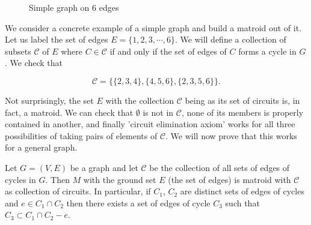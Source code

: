 \begin{figure}[H]
\centering

\caption{Simple graph on 6 edges}
  \label{simp}

\end{figure}

We consider a concrete example of a simple graph and build a matroid out of it. Let us label the set of edges $E = \{1, 2, 3, \cdots, 6\}$. We will define a collection of subsets $\mathcal{C}$ of $E$ where $C \in \mathcal{C}$ if and only if the set of edges of $C$ forms a cycle in $G$. We check that 

    $$\mathcal{C} = \{\{2,3,4\}, \{4,5,6\}, \{2, 3, 5, 6\}\}.$$

Not surprisingly, the set $E$ with the collection $\mathcal{C}$ being as its set of circuits is, in fact, a matroid. We can check that $\emptyset$ is not in $\mathcal{C}$, none of its members is properly contained in another, and finally 'circuit elimination axiom' works for all three possibilities of taking pairs of elements of $\mathcal{C}$. We will now prove that this works for a general graph.

\begin{theorem}\label{graphicproof}
Let $G = (V, E)$ be a graph and let $\mathcal{C}$ be the collection of all sets of edges of cycles in $G$. Then $M$ with the ground set $E$ (the set of edges) is matroid with $\mathcal{C}$ as collection of circuits. In particular, if $C_1$, $C_2$ are distinct sets of edges of cycles  and $e \in C_1 \cap C_2 $ then there exists a set of edges of cycle $C_3$ such that $C_3 \subset C_1 \cap C_2 -e$.
\end{theorem}


